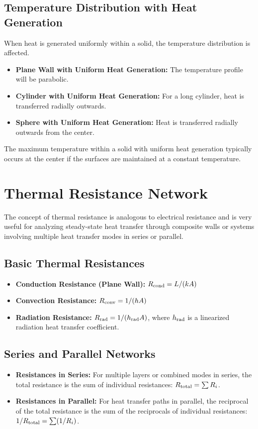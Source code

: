 \subsection{Temperature Distribution with Heat Generation}
When heat is generated uniformly within a solid, the temperature distribution is affected.
\begin{itemize}
    \item \textbf{Plane Wall with Uniform Heat Generation:} The temperature profile will be parabolic.
    \item \textbf{Cylinder with Uniform Heat Generation:} For a long cylinder, heat is transferred radially outwards.
    \item \textbf{Sphere with Uniform Heat Generation:} Heat is transferred radially outwards from the center.
\end{itemize}
The maximum temperature within a solid with uniform heat generation typically occurs at the center if the surfaces are maintained at a constant temperature.

\section{Thermal Resistance Network}
The concept of thermal resistance is analogous to electrical resistance and is very useful for analyzing steady-state heat transfer through composite walls or systems involving multiple heat transfer modes in series or parallel.

\subsection{Basic Thermal Resistances}
\begin{itemize}
    \item \textbf{Conduction Resistance (Plane Wall):} $R_{\text{cond}} = L/(k A)$
    \item \textbf{Convection Resistance:} $R_{\text{conv}} = 1/(h A)$
    \item \textbf{Radiation Resistance:} $R_{\text{rad}} = 1/(h_{\text{rad}} A)$, where $h_{\text{rad}}$ is a linearized radiation heat transfer coefficient.
\end{itemize}

\subsection{Series and Parallel Networks}
\begin{itemize}
    \item \textbf{Resistances in Series:} For multiple layers or combined modes in series, the total resistance is the sum of individual resistances: $R_{\text{total}} = \sum R_i$.
    \item \textbf{Resistances in Parallel:} For heat transfer paths in parallel, the reciprocal of the total resistance is the sum of the reciprocals of individual resistances: $1/R_{\text{total}} = \sum (1/R_i)$.
\end{itemize}

